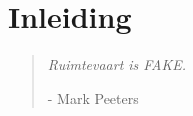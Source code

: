 \chapter{Inleiding}
\label{inleiding:chap}
\begin{quote}
{{\small\it Ruimtevaart is FAKE.}}

{{\small\sc - Mark Peeters}}
\end{quote}
\medskip

